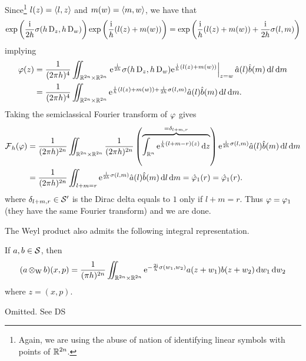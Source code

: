 \begin{prf}
\[\]
Since\footnote{Again, we are using the abuse of nation of identifying linear symbols with points of $\mathbb{R}^{2n}$.} $l(z)=\left< l,z\right>$ and $m(w)=\left< m,w\right>$, we have that 
\[
\exp\left(\frac{\mathrm{i}}{2h}\sigma(h\operatorname{D}_{z},h\operatorname{D}_{w})\right)\exp\left(
\frac{\mathrm{i}}{h}(l(z)+m(w))
\right)=\exp\left(
\frac{\mathrm{i}}{h}(l(z)+m(w))+\frac{\mathrm{i}}{2h}\sigma(l,m)
\right)
\]
implying
\begin{align*}
\varphi(z)&=\frac{1}{(2\pi h)^{4}}\iint_{\mathbb{R}^{2n}\times\mathbb{R}^{2n}}\left.\mathrm{e}^{\frac{\mathrm{i}}{2h}}\sigma(h\operatorname{D}_{z},h\operatorname{D}_{w})\mathrm{e}^{\frac{\mathrm{i}}{h}(l(z)+m(w))}\right|_{z=w}\hat{a}(l)\hat{b}(m)\mathop{}\!\mathrm{d} l\mathop{}\!\mathrm{d} m
\\
&=\frac{1}{(2\pi h)^{4}}\iint_{\mathbb{R}^{2n}\times\mathbb{R}^{2n}}\mathrm{e}^{\frac{\mathrm{i}}{h}(l(z)+m(w))+\frac{\mathrm{i}}{2h}\sigma(l,m)}\hat{a}(l)\hat{b}(m)\mathop{}\!\mathrm{d} l\mathop{}\!\mathrm{d} m.
\end{align*}
Taking the semiclassical Fourier transform of $\varphi$ gives
\begin{align*}
\operatorname{\mathcal{F}}_{h}(\varphi)&=\frac{1}{(2\pi h)^{2n}}\iint_{\mathbb{R}^{2n}\times\mathbb{R}^{2n}}\frac{1}{(2\pi h)^{2n}}\left(\overbrace{
\int_{\mathbb{R}^{n}}\mathrm{e}^{\frac{\mathrm{i}}{h}(l+m-r)(z)}\mathop{}\!\mathrm{d} z
}^{=\delta_{l+m,r}}\right)
\mathrm{e}^{\frac{\mathrm{i}}{2h}\sigma(l,m)}\hat{a}(l)\hat{b}(m)\mathop{}\!\mathrm{d} l\mathop{}\!\mathrm{d} m\\
&=\frac{1}{(2\pi h)^{2n}}\iint_{l+m=r}\mathrm{e}^{\frac{\mathrm{i}}{2h}\sigma(l,m)}\hat{a}(l)\hat{b}(m)\mathop{}\!\mathrm{d} l\mathop{}\!\mathrm{d} m=\hat{\varphi}_{1}(r)=\hat{\varphi}_{1}(r).
\end{align*}
where $\delta_{l+m,r}\in\mathcal{S}'$ is the Dirac delta equals to $1$ only if $l+m=r$. Thus $\varphi=\varphi_{1}$ (they have the same Fourier transform) and we are done.
\end{prf}



The Weyl product also admits the following integral representation.

\begin{nprop}
If $a,b\in\mathcal{S}$, then 
\[
(a\operatorname{\otimes_{W}} b)(x,p)=\frac{1}{(\pi h)^{2n}}\iint_{\mathbb{R}^{2n}\times\mathbb{R}^{2n}}\mathrm{e}^{-\frac{2\mathrm{i}}{h}\sigma(w_{1},w_{2})}a(z+w_{1})b(z+w_{2})\mathop{}\!\mathrm{d} w_{1}\mathop{}\!\mathrm{d} w_{2}
\]
where $z=(x,p)$.
\end{nprop}
\begin{prf}
Omitted. See DS
\end{prf}

